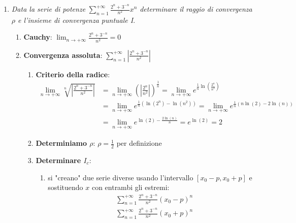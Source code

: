 \documentclass[10pt, a4paper]{article}
\begin{document}
\begin{enumerate}
\begin{enumerate}
            \end{enumerate}
            \item \textit{Data la serie di potenze} $\sum_{n=1}^{+\infty}\frac{2^n+3^{-n}}{n^2}x^n$ \textit{determinare il raggio di convergenza $\rho$ e l'insieme di convergenza puntuale I}. \begin{enumerate}
                \item \textbf{Cauchy}: $\lim_{n\rightarrow+\infty}\frac{2^n+3^{-n}}{n^2}=0$
                \item \textbf{Convergenza assoluta}: $\sum_{n=1}^{+\infty}\left|\frac{2^n+3^{-n}}{n^2}\right|$
                \begin{enumerate}
                    \item \textbf{Criterio della radice}: \begin{equation*}
                        \begin{split}
                            \lim_{n\rightarrow+\infty}\sqrt[n]{\left|\frac{2^n+3^{-n}}{n^2}\right|}&=\lim_{n\rightarrow+\infty}\left(\left|\frac{2^n}{n^2}\right|\right)^{\frac{1}{n}}=\lim_{n\rightarrow+\infty}e^{\frac{1}{n}\ln\left(\frac{2^n}{n^2}\right)}\\
                            &=\lim_{n\rightarrow+\infty}e^{\frac{1}{n}\left(\ln\left({2^n}\right)-\ln\left({n^2}\right)\right)}=\lim_{n\rightarrow+\infty}e^{\frac{1}{n}\left(n\ln\left({2}\right)-2\ln\left({n}\right)\right)}\\
                            &=\lim_{n\rightarrow+\infty}e^{\ln\left({2}\right)-\frac{2\ln\left({n}\right)}{n}}=e^{\ln(2)}=2
                        \end{split}
                    \end{equation*}
                    \item \textbf{Determiniamo $\rho$}: $\rho=\frac{1}{2}$ per definizione\\
                    \item \textbf{Determinare $I_c$}: \begin{enumerate}
                        \item si "creano" due serie diverse usando l'intervallo $\left[x_0-p,x_0+p\right]$ e sostituendo $x$ con entrambi gli estremi: \begin{equation*}
                            \begin{split}
                                &\sum_{n=1}^{+\infty}\frac{2^n+3^{-n}}{n^2}\left(x_0-p\right)^n\\
                                &\sum_{n=1}^{+\infty}\frac{2^n+3^{-n}}{n^2}\left(x_0+p\right)^n

\end{split}
\end{equation*}
\end{enumerate}
\end{enumerate}
\end{enumerate}
\end{enumerate}
\end{document}
